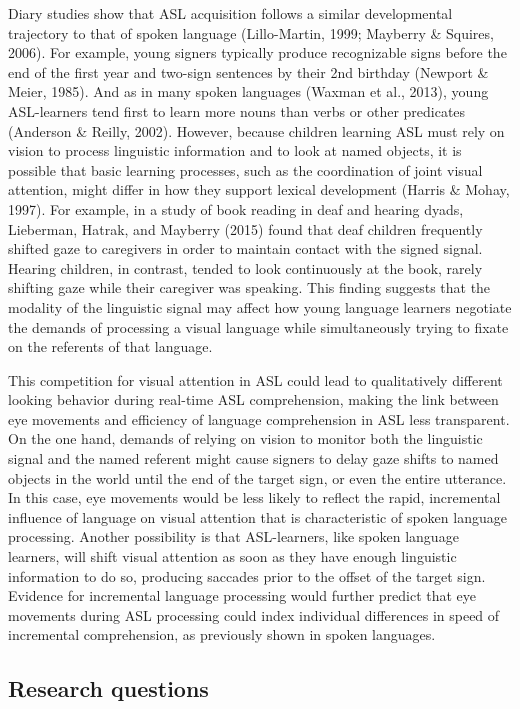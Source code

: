 \documentclass[oneside]{report}
\begin{document}
Diary studies show that ASL acquisition follows a similar developmental
trajectory to that of spoken language (Lillo-Martin, 1999; Mayberry \&
Squires, 2006). For example, young signers typically produce
recognizable signs before the end of the first year and two-sign
sentences by their 2nd birthday (Newport \& Meier, 1985). And as in many
spoken languages (Waxman et al., 2013), young ASL-learners tend first to
learn more nouns than verbs or other predicates (Anderson \& Reilly,
2002). However, because children learning ASL must rely on vision to
process linguistic information and to look at named objects, it is
possible that basic learning processes, such as the coordination of
joint visual attention, might differ in how they support lexical
development (Harris \& Mohay, 1997). For example, in a study of book
reading in deaf and hearing dyads, Lieberman, Hatrak, and Mayberry
(2015) found that deaf children frequently shifted gaze to caregivers in
order to maintain contact with the signed signal. Hearing children, in
contrast, tended to look continuously at the book, rarely shifting gaze
while their caregiver was speaking. This finding suggests that the
modality of the linguistic signal may affect how young language learners
negotiate the demands of processing a visual language while
simultaneously trying to fixate on the referents of that language.

This competition for visual attention in ASL could lead to qualitatively
different looking behavior during real-time ASL comprehension, making
the link between eye movements and efficiency of language comprehension
in ASL less transparent. On the one hand, demands of relying on vision
to monitor both the linguistic signal and the named referent might cause
signers to delay gaze shifts to named objects in the world until the end
of the target sign, or even the entire utterance. In this case, eye
movements would be less likely to reflect the rapid, incremental
influence of language on visual attention that is characteristic of
spoken language processing. Another possibility is that ASL-learners,
like spoken language learners, will shift visual attention as soon as
they have enough linguistic information to do so, producing saccades
prior to the offset of the target sign. Evidence for incremental
language processing would further predict that eye movements during ASL
processing could index individual differences in speed of incremental
comprehension, as previously shown in spoken languages.

\hypertarget{research-questions}{%
\subsection{Research questions}\label{research-questions}}
\end{document}
